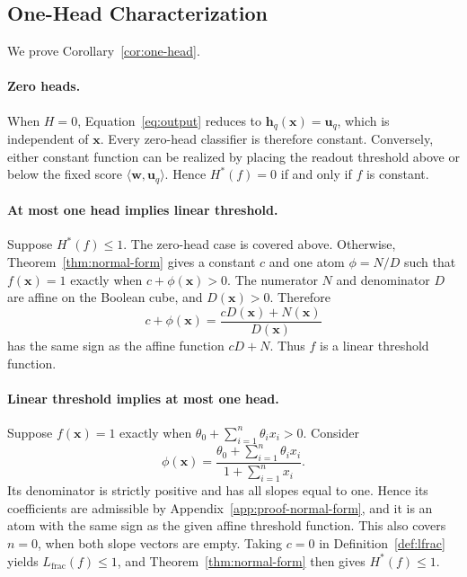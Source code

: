\documentclass{article}
\theoremstyle{definition}
\theoremstyle{plain}
\newcommand{\hstar}{H^{\ast}}
\begin{document}
\subsection{One-Head Characterization}
\label{app:proof-one-head}

We prove Corollary~\ref{cor:one-head}.

\paragraph{Zero heads.}
When $H=0$, Equation~\eqref{eq:output} reduces to $\mathbf{h}_q(\mathbf{x})=\mathbf{u}_q$, which is independent of $\mathbf{x}$. Every zero-head classifier is therefore constant. Conversely, either constant function can be realized by placing the readout threshold above or below the fixed score $\langle\mathbf{w},\mathbf{u}_q\rangle$. Hence $\hstar(f)=0$ if and only if $f$ is constant.

\paragraph{At most one head implies linear threshold.}
Suppose $\hstar(f)\leq1$. The zero-head case is covered above. Otherwise, Theorem~\ref{thm:normal-form} gives a constant $c$ and one atom $\phi=N/D$ such that $f(\mathbf{x})=1$ exactly when $c+\phi(\mathbf{x})>0$. The numerator $N$ and denominator $D$ are affine on the Boolean cube, and $D(\mathbf{x})>0$. Therefore
\begin{equation}
c+\phi(\mathbf{x})
=\frac{cD(\mathbf{x})+N(\mathbf{x})}{D(\mathbf{x})}
\end{equation}
has the same sign as the affine function $cD+N$. Thus $f$ is a linear threshold function.

\paragraph{Linear threshold implies at most one head.}
Suppose $f(\mathbf{x})=1$ exactly when $\theta_0+\sum_{i=1}^{n}\theta_ix_i>0$. Consider
\begin{equation}
\phi(\mathbf{x})=\frac{\theta_0+\sum_{i=1}^{n}\theta_ix_i}{1+\sum_{i=1}^{n}x_i}.
\end{equation}
Its denominator is strictly positive and has all slopes equal to one. Hence its coefficients are admissible by Appendix~\ref{app:proof-normal-form}, and it is an atom with the same sign as the given affine threshold function. This also covers $n=0$, when both slope vectors are empty. Taking $c=0$ in Definition~\ref{def:lfrac} yields $L_{\mathrm{frac}}(f)\leq1$, and Theorem~\ref{thm:normal-form} then gives $\hstar(f)\leq1$.
\end{document}
